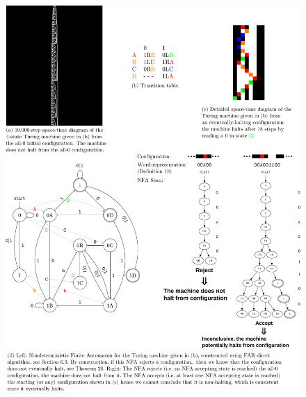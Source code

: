 \begin{figure}
  \centering
  \includegraphics*[scale=0.65]{figures/FAR-finite-automata-reduction/FAR-texts.pdf}


\end{figure}
